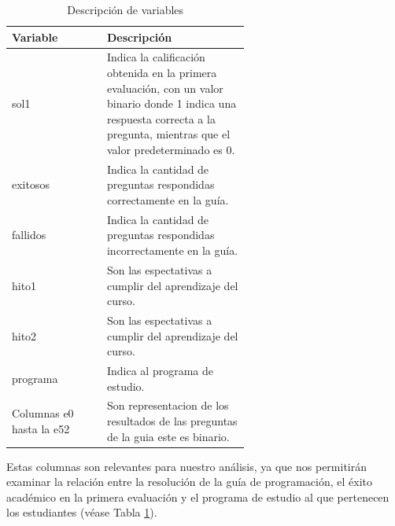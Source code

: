 \begin{table}[H]
  \centering
  \caption{Descripción de variables}
  \begin{tabular}{|l|p{0.6\linewidth}|}
    \hline
    \textbf{Variable}        & \textbf{Descripción}                                                                                                                                                           \\
    \hline
    sol1                     & Indica la calificación obtenida en la primera evaluación, con un valor binario donde 1 indica una respuesta correcta a la pregunta, mientras que el valor predeterminado es 0. \\
    \hline
    exitosos                 & Indica la cantidad de preguntas respondidas correctamente en la guía.                                                                                                          \\
    \hline
    fallidos                 & Indica la cantidad de preguntas respondidas incorrectamente en la guía.                                                                                                        \\
    \hline
    hito1                    & Son las espectativas a cumplir del aprendizaje del curso.                                                                                                                      \\
    \hline
    hito2                    & Son las espectativas a cumplir del aprendizaje del curso.                                                                                                                      \\
    \hline
    programa                 & Indica al programa de estudio.                                                                                                                                                 \\
    \hline
    Columnas e0 hasta la e52 & Son representacion de los resultados de las preguntas de la guia este es binario.                                                                                              \\
    \hline
  \end{tabular}
  \label{tab:variables}
\end{table}


Estas columnas son relevantes para nuestro análisis, ya que nos permitirán examinar la relación
entre la resolución de la guía de programación, el éxito académico en la primera evaluación y
el programa de estudio al que pertenecen los estudiantes (véase Tabla \ref{tab:variables}).



